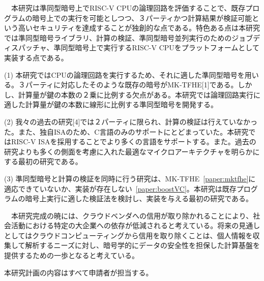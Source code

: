 
　本研究は準同型暗号上でRISC-V CPUの論理回路を評価することで、既存プログラムの暗号上での実行を可能としつつ、３パーティかつ計算結果が検証可能という高いセキュリティを達成することが独創的な点である。特色ある点は本研究では準同型暗号ライブラリ、計算の検証、準同型暗号並列実行のためのジョブディスパッチャ、準同型暗号上で実行するRISC-V CPUをプラットフォームとして実装する点である。


\noindent(1)	本研究ではCPUの論理回路を実行するため、それに適した準同型暗号を用いる。３パーティに対応したそのような既存の暗号がMK-TFHE[1]である。しかし、計算量が鍵の本数の２乗に比例する欠点がある。本研究では論理回路実行に適した計算量が鍵の本数に線形に比例する準同型暗号を開発する。

\noindent(2)	我々の過去の研究[4]では２パーティに限られ、計算の検証は行えていなかった。また、独自ISAのため、C言語のみのサポートにとどまっていた。本研究ではRISC-V ISAを採用することでより多くの言語をサポートする。また。過去の研究よりも多くの側面を考慮に入れた最適なマイクロアーキテクチャを明らかにする最初の研究である。

\noindent(3)	準同型暗号と計算の検証を同時に行う研究は、MK-TFHE~\ref{paper:mktfhe}に適応できていないか、実装が存在しない~\ref{paper:boostVC}。本研究は既存プログラムの暗号上実行に適した検証法を検討し、実装を与える最初の研究である。


　本研究完成の暁には、クラウドベンダへの信用が取り除かれることにより、社会活動における特定の大企業への依存が低減されると考えている。将来の見通しとしてはクラウドコンピューティングから信用を取り除くことは、個人情報を収集して解析するニーズに対し、暗号学的にデータの安全性を担保した計算基盤を提供するための一歩となると考えている。

 本研究計画の内容はすべて申請者が担当する。

